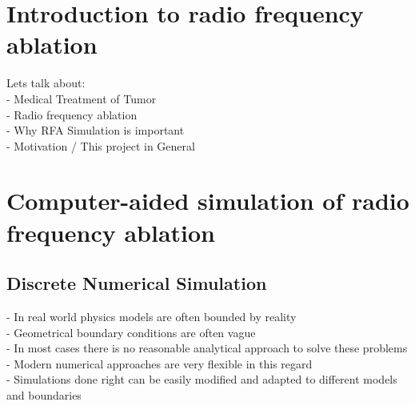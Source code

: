 \documentclass[parskip=half, titlepage=yes, 12pt, BCOR=12mm, DIV=calc]{scrartcl}
\begin{document}
\maketitle
\tableofcontents

\clearpage




\section{Introduction to radio frequency ablation}
Lets talk about:\\
- Medical Treatment of Tumor\\
- Radio frequency ablation\\
- Why RFA Simulation is important \\
- {Motivation / This project in General}\\



\section{Computer-aided simulation of radio frequency ablation}

\subsection{Discrete Numerical Simulation}
- In real world physics models are often bounded by reality \\
- Geometrical boundary conditions are often vague \\
- In most cases there is no reasonable analytical approach to solve these problems \\
- Modern numerical approaches are very flexible in this regard \\
- Simulations done right can be easily modified and adapted to different models and boundaries \\
\end{document}

